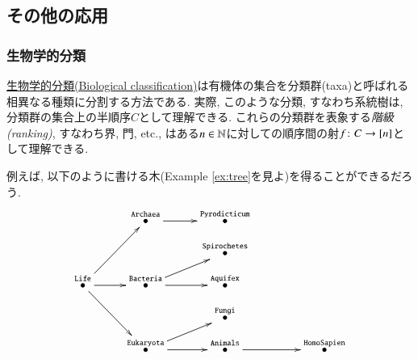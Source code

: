 
\subsection{その他の応用}


\subsubsection{生物学的分類}


\href{http://en.wikipedia.org/wiki/Biological_classification}{生物学的分類(Biological classification)}は有機体の集合を分類群(taxa)と呼ばれる相異なる種類に分割する方法である. 実際, このような分類, すなわち系統樹は, 分類群の集合上の半順序$C$として理解できる. これらの分類群を表象する\emph{階級(ranking)}, すなわち界, 門, etc., はある$n\in{\mathbb N}$に対しての順序間の射$f\colon C\rightarrow [n]$として理解できる.

例えば, 以下のように書ける木(Example \ref{ex:tree}を見よ)を得ることができるだろう. 
$$
\xymatrix@=10pt{
&&\LTO{Archaea}\ar[rr]&&\LTO{Pyrodicticum}\\
&&&&\LTO{Spirochetes}\\
\LTO{Life}\ar[rr]\ar[ddrr]\ar[uurr]&&\LTO{Bacteria}\ar[rr]\ar[rru]&&\LTO{Aquifex}\\
&&&&\LTO{Fungi}\\
&&\LTO{Eukaryota}\ar[rr]\ar[urr]&&\LTO{Animals}\ar[rrr]&&&\LTO{Homo Sapien}}
$$

